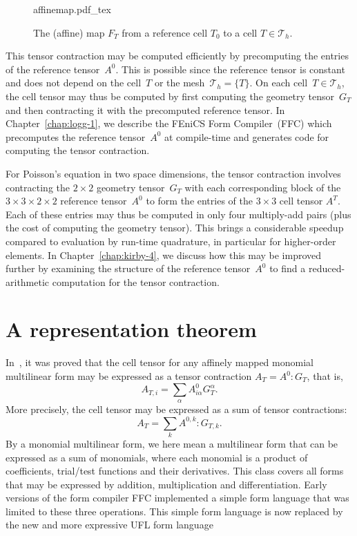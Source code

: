 \begin{figure}
  \begin{center}
    \def\svgwidth{\largefig}
    {affinemap.pdf_tex}
    \caption{The (affine) map $F_T$ from a reference cell $T_0$
      to a cell $T \in \mathcal{T}_h$.}
    \label{fig:affinemap}
  \end{center}
\end{figure}

This tensor contraction may be computed efficiently by precomputing
the entries of the reference tensor~$A^0$. This is possible since the
reference tensor is constant and does not depend on the cell~$T$ or
the mesh~$\mathcal{T}_h = \{T\}$. On each cell~$T \in \mathcal{T}_h$,
the cell tensor may thus be computed by first computing the geometry
tensor~$G_T$ and then contracting it with the precomputed reference
tensor. In Chapter~\ref{chap:logg-1}, we describe the FEniCS Form
Compiler~(FFC) which precomputes the reference tensor~$A^0$ at
compile-time and generates code for computing the tensor contraction.

For Poisson's equation in two space dimensions, the tensor contraction
involves contracting the $2 \times 2$ geometry tensor~$G_T$ with each
corresponding block of the $3 \times 3 \times 2 \times 2$ reference
tensor~$A^0$ to form the entries of the $3 \times 3$ cell tensor
$A^T$. Each of these entries may thus be computed in only four
multiply-add pairs (plus the cost of computing the geometry
tensor). This brings a considerable speedup compared to evaluation by
run-time quadrature, in particular for higher-order elements. In
Chapter~\ref{chap:kirby-4}, we discuss how this may be improved
further by examining the structure of the reference tensor~$A^0$ to
find a reduced-arithmetic computation for the tensor contraction.

\section{A representation theorem}

In~\citet{KirbyLogg2006}, it was proved that the cell tensor for any
affinely mapped monomial multilinear form may be expressed as a tensor
contraction $A_T = A^0 : G_T$, that is,
\begin{equation}
  A_{T,i} = \sum_{\alpha} A^0_{i\alpha} G_T^{\alpha}.
\end{equation}
More precisely, the cell tensor may be expressed as a sum of tensor
contractions:
\begin{equation} \label{eq:tensorcontraction}
  A_T = \sum_k A^{0,k} : G_{T,k}.
\end{equation}
By a monomial multilinear form, we here mean a multilinear form that
can be expressed as a sum of monomials, where each monomial is a
product of coefficients, trial/test functions and their derivatives.
This class covers all forms that may be expressed by addition,
multiplication and differentiation. Early versions of the form
compiler FFC implemented a simple form language that was limited to
these three operations. This simple form language is now replaced by
the new and more expressive UFL form language

